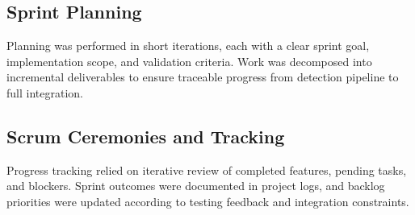 \subsection{Sprint Planning}
Planning was performed in short iterations, each with a clear sprint goal, implementation scope, and validation criteria. Work was decomposed into incremental deliverables to ensure traceable progress from detection pipeline to full integration.

\subsection{Scrum Ceremonies and Tracking}
Progress tracking relied on iterative review of completed features, pending tasks, and blockers. Sprint outcomes were documented in project logs, and backlog priorities were updated according to testing feedback and integration constraints.
